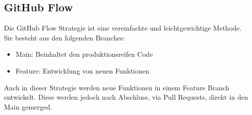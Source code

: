 \subsection{GitHub Flow}
Die GitHub Flow Strategie ist eine vereinfachte und leichtgewichtige Methode. Sie besteht aus den folgenden Branches:
\begin{itemize}
    \item Main: Beinhaltet den produktionsreifen Code  
    \item Feature: Entwicklung von neuen Funktionen
\end{itemize}
Auch in dieser Strategie werden neue Funktionen in einem Feature Branch entwickelt. Diese werden jedoch nach Abschluss, via Pull Requests, direkt in den Main gemerged.
\parencite{priyanka_gowdaashwath_narayana_gowda_git-branching-and-release-strategies_2022}





